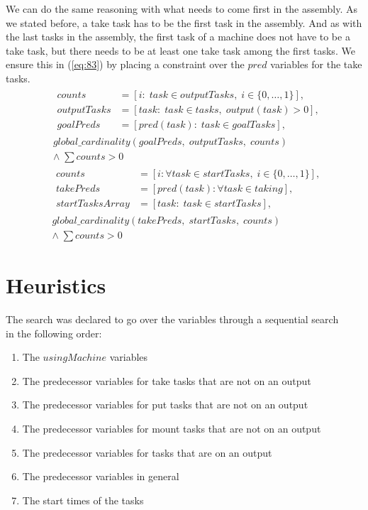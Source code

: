    We can do the same reasoning with what needs to come first in the assembly. As we stated before, a take task has to be the first task in the assembly. And as with the last tasks in the assembly, the first task of a machine does not have to be a take task, but there needs to be at least one take task among the first tasks. We ensure this in (\ref{eq:83}) by placing a constraint over the $pred$ variables for the take tasks.
  \begin{equation}
  \begin{aligned}\label{eq:82}
  &\begin{aligned}
  counts &= [i : \; task \in outputTasks, \; i \in \{0 , \ldots , 1\}], \\
  outputTasks &= [task : \; task \in tasks, \; output(task) > 0], \\
  goalPreds &= [pred(task) : \; task \in goalTasks],
  \end{aligned} \\
  &global\_cardinality(goalPreds, \; outputTasks, \; counts)\\
  &\land \; \sum counts > 0
  \end{aligned}
  \end{equation}
   \begin{equation}
   \begin{aligned}\label{eq:83}
   &\begin{aligned}
   counts &= [i : \forall task \in startTasks, \; i \in \{0 , \ldots , 1\}], \\
   takePreds &= [pred(task) : \forall task \in taking], \\
   startTasksArray &= [task : \; task \in startTasks], 
   \end{aligned}\\
   &global\_cardinality(takePreds, \; startTasks, \; counts) \\
   &\land \; \sum counts > 0
   \end{aligned}
   \end{equation}
   
   \section{Heuristics}
   The search was declared to go over the variables through a sequential search\\\cite{mz_tute} in the following order:
   
   \begin{enumerate}
   \item The $usingMachine$ variables
   \item The predecessor variables for take tasks that are not on an output
   \item The predecessor variables for put tasks that are not on an output
   \item The predecessor variables for mount tasks that are not on an output
   \item The predecessor variables for tasks that are on an output
   \item The predecessor variables in general
   \item The start times of the tasks
   \end{enumerate}
   
